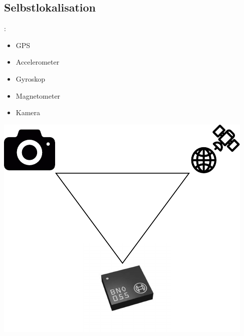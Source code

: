 \documentclass{beamer}
\begin{document}
\subsection{Selbstlokalisation}
\begin{frame}{\insertsection: \insertsubsection}
\begin{minipage}{0.45\linewidth}
	\begin{itemize}
		\item GPS
		\item Accelerometer
		\item Gyroskop
		\item Magnetometer
		\item Kamera
	\end{itemize}
\end{minipage} \quad
\begin{minipage}{0.45\linewidth}
	\includegraphics[width=\linewidth]{selbstlokalisation}
\end{minipage}
\end{frame}
\end{document}
